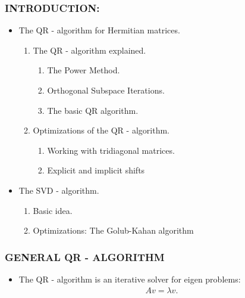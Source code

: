 \documentclass[a4paper,8pt]{beamer} %
\begin{document}



\begin{frame}  %
\frametitle{INTRODUCTION:}
\begin{itemize}
\item The QR - algorithm for Hermitian matrices.
	\begin{enumerate}
		\item The QR - algorithm explained.
			\begin{enumerate}
				\item The Power Method.
				\item Orthogonal Subspace Iterations.
				\item The basic QR algorithm.
			\end{enumerate}
		\item Optimizations of the QR - algorithm.
			\begin{enumerate}
				\item Working with tridiagonal matrices.
				\item Explicit and implicit shifts
			\end{enumerate}
	\end{enumerate}
\item The SVD - algorithm. 
	\begin{enumerate}
		\item Basic idea.
		\item Optimizations: The Golub-Kahan algorithm
	\end{enumerate}
\end{itemize}
\end{frame} %
\begin{frame}%
	\frametitle{GENERAL QR - ALGORITHM}
	\begin{itemize}
		\item 
			The QR - algorithm is an iterative solver for eigen problems:
			\begin{align}
				Av=\lambda v.
			\end{align}
	\end{itemize}
\end{frame}%
\end{document}
